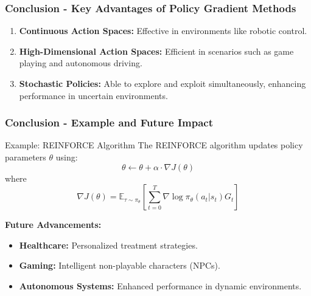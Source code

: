 \documentclass[aspectratio=169]{beamer}
\begin{document}
\begin{frame}[fragile]
    \frametitle{Conclusion - Key Advantages of Policy Gradient Methods}
    
    \begin{enumerate}
        \item \textbf{Continuous Action Spaces:} Effective in environments like robotic control.
        \item \textbf{High-Dimensional Action Spaces:} Efficient in scenarios such as game playing and autonomous driving.
        \item \textbf{Stochastic Policies:} Able to explore and exploit simultaneously, enhancing performance in uncertain environments.
    \end{enumerate}
\end{frame}

\begin{frame}[fragile]
    \frametitle{Conclusion - Example and Future Impact}
    
    \begin{block}{Example: REINFORCE Algorithm}
        The REINFORCE algorithm updates policy parameters \( \theta \) using:
        \[
        \theta \leftarrow \theta + \alpha \cdot \nabla J(\theta)
        \]
        where
        \[
        \nabla J(\theta) = \mathbb{E}_{\tau \sim \pi_\theta} \left[ \sum_{t=0}^{T} \nabla \log \pi_\theta(a_t | s_t) G_t \right]
        \]
    \end{block}
    
    \textbf{Future Advancements:}
    \begin{itemize}
        \item \textbf{Healthcare:} Personalized treatment strategies.
        \item \textbf{Gaming:} Intelligent non-playable characters (NPCs).
        \item \textbf{Autonomous Systems:} Enhanced performance in dynamic environments.
    \end{itemize}
\end{frame}
\end{document}
